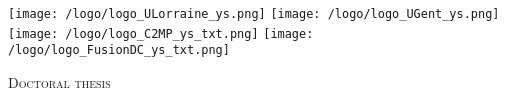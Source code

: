 \begin{titlepage}

\begin{center}
\texttt{[image: /logo/logo\_ULorraine\_ys.png]} \hspace{+1cm}
\texttt{[image: /logo/logo\_UGent\_ys.png]} \\

\vspace{+0.5cm}
\texttt{[image: /logo/logo\_C2MP\_ys\_txt.png]} \hspace{+1cm}
\texttt{[image: /logo/logo\_FusionDC\_ys\_txt.png]} \\

\vspace{0.3cm}


\vspace{0.3cm}
{\LARGE \textsc{Doctoral thesis\\}}



\vspace{0.3cm}


\end{center}
\end{titlepage}
